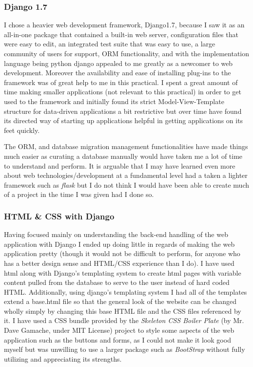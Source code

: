 \documentclass[11pt,a4paper]{article}
\begin{document}
\subsubsection{Django 1.7}
I chose a heavier web development framework, Django1.7, because I saw it as an all-in-one package that contained a built-in web server, configuration files that were easy to edit, an integrated test suite that was easy to use, a large community of users for support, ORM functionality, and with the implementation language being python django appealed to me greatly as a newcomer to web development. Moreover the availability and ease of installing plug-ins to the framework was of great help to me in this practical. I spent a great amount of time making smaller applications (not relevant to this practical) in order to get used to the framework and initially found its strict Model-View-Template structure for data-driven applications a bit restrictive but over time have found its directed way of starting up applications helpful in getting applications on its feet quickly.

The ORM, and database migration management functionalities have made things much easier as curating a database manually would have taken me a lot of time to understand and perform. It is arguable that I may have learned even more about web technologies/development at a fundamental level had a taken a lighter framework such as \textit{flask} but I do not think I would have been able to create much of a project in the time I was given had I done so.

\subsubsection{HTML \& CSS with Django}
Having focused mainly on understanding the back-end handling of the web application with Django I ended up doing little in regards of making the web application pretty (though it would not be difficult to perform, for anyone who has a better design sense and HTML/CSS experience than I do). I have used html along with Django's templating system to create html pages with variable content pulled from the database to serve to the user instead of hard coded HTML. Additionally, using django's templating system I had all of the templates extend a base.html file so that the general look of the website can be changed wholly simply by changing this base HTML file and the CSS files referenced by it. I have used a CSS bundle provided by the \textit{Skeleton CSS Boiler Plate} (by Mr. Dave Gamache, under MIT License) project to style some aspects of the web application such as the buttons and forms, as I could not make it look good myself but was unwilling to use a larger package such as \textit{BootStrap} without fully utilizing and appreciating its strengths.
 
\end{document}
